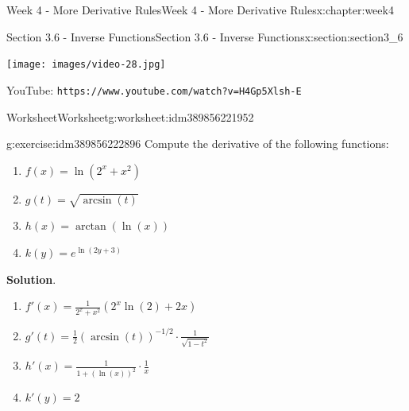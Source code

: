 \documentclass[oneside,10pt,]{book}
\newcommand{\blocktitlefont}{\relax}
\newcommand{\mono}[1]{\texttt{#1}}
\numberwithin{equation}{section}
\newlength{\qrsize}
\newlength{\previewwidth}
\begin{document}
\begin{chapterptx}{Week 4 - More Derivative Rules}{}{Week 4 - More Derivative Rules}{}{}{x:chapter:week4}
\begin{sectionptx}{Section 3.6 - Inverse Functions}{}{Section 3.6 - Inverse Functions}{}{}{x:section:section3_6}
\begin{tcbraster}[raster columns=2, raster column skip=1pt, raster halign=center, raster force size=false, raster left skip=0pt, raster right skip=0pt]
\begin{tcolorbox}[previewstyle, width=\previewwidth]%
\texttt{[image: images/video-28.jpg]}%
\end{tcolorbox}%
\begin{tcolorbox}[qrstyle]%
{\hypersetup{urlcolor=black}}%
\end{tcolorbox}%
\begin{tcolorbox}[captionstyle]%
\small YouTube: \mono{https://www.youtube.com/watch?v=H4Gp5Xlsh-E}\end{tcolorbox}%
\end{tcbraster}%
%
%
\typeout{************************************************}
\typeout{************************************************}
%
\begin{worksheet-subsection}{Worksheet}{}{Worksheet}{}{}{g:worksheet:idm389856221952}
\begin{divisionexercise}{1}{}{}{g:exercise:idm389856222896}%
Compute the derivative of the following functions:%
%
\begin{enumerate}[label=(\alph*)]
\item{}\(\displaystyle f(x) = \ln(2^x+x^2)\)%
\item{}\(\displaystyle g(t) = \sqrt{\arcsin(t)}\)%
\item{}\(\displaystyle h(x) = \arctan(\ln(x))\)%
\item{}\(\displaystyle k(y) = e^{\ln (2y+3)}\)%
\end{enumerate}
\textbf{\blocktitlefont Solution}.\hypertarget{g:solution:idm389856228832}{}\quad{}%
\begin{enumerate}[label=(\alph*)]
\item{}\(\displaystyle f'(x) = \frac{1}{2^x+x^2} (2^x\ln(2)+2x)\)%
\item{}\(\displaystyle g'(t) = \frac 12(\arcsin(t))^{-1/2} \cdot \frac{1}{\sqrt{1-t^2}}\)%
\item{}\(\displaystyle h'(x) = \frac{1}{1+(\ln(x))^2}\cdot \frac 1x\)%
\item{}\(\displaystyle k'(y) = 2\)%
\end{enumerate}
\end{divisionexercise}%
\end{worksheet-subsection}
\restoregeometry
\setlength{\qrsize}{9em}
\setlength{\previewwidth}{\linewidth}
\addtolength{\previewwidth}{-\qrsize}
\begin{tcbraster}[raster columns=2, raster column skip=1pt, raster halign=center, raster force size=false, raster left skip=0pt, raster right skip=0pt]%

\end{tcbraster}
\end{sectionptx}
\end{chapterptx}
\end{document}
